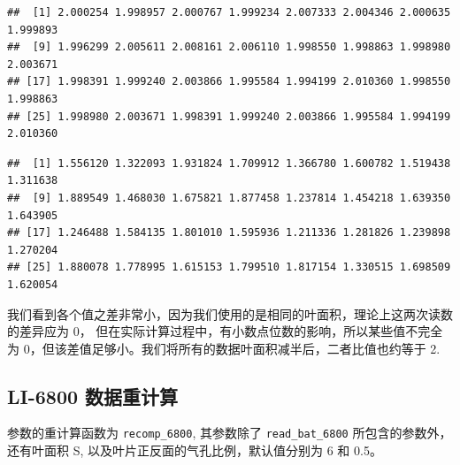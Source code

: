 \documentclass[
]{krantz}
\makeatletter
\newenvironment{Shaded}{\begin{snugshade}}{\end{snugshade}}
\newcommand{\CommentTok}[1]{\textcolor[rgb]{0.56,0.35,0.01}{\textit{#1}}}
\newcommand{\DataTypeTok}[1]{\textcolor[rgb]{0.13,0.29,0.53}{#1}}
\newcommand{\DecValTok}[1]{\textcolor[rgb]{0.00,0.00,0.81}{#1}}
\newcommand{\FloatTok}[1]{\textcolor[rgb]{0.00,0.00,0.81}{#1}}
\newcommand{\KeywordTok}[1]{\textcolor[rgb]{0.13,0.29,0.53}{\textbf{#1}}}
\newcommand{\NormalTok}[1]{#1}
\newcommand{\OperatorTok}[1]{\textcolor[rgb]{0.81,0.36,0.00}{\textbf{#1}}}
\newcommand{\StringTok}[1]{\textcolor[rgb]{0.31,0.60,0.02}{#1}}
\newenvironment{kframe}{%
\medskip{}
\setlength{\fboxsep}{.8em}
 \def\at@end@of@kframe{}%
 \ifinner\ifhmode%
  \def\at@end@of@kframe{\end{minipage}}%
  \begin{minipage}{\columnwidth}%
 \fi\fi%
 \def\FrameCommand##1{\hskip\@totalleftmargin \hskip-\fboxsep
 \colorbox{shadecolor}{##1}\hskip-\fboxsep
     \hskip-\linewidth \hskip-\@totalleftmargin \hskip\columnwidth}%
 \MakeFramed {\advance\hsize-\width
   \@totalleftmargin\z@ \linewidth\hsize
   \@setminipage}}%
 {\par\unskip\endMakeFramed%
 \at@end@of@kframe}
\renewenvironment{Shaded}{\begin{kframe}}{\end{kframe}}
\makeatother
\begin{document}
\begin{verbatim}
##  [1] 2.000254 1.998957 2.000767 1.999234 2.007333 2.004346 2.000635 1.999893
##  [9] 1.996299 2.005611 2.008161 2.006110 1.998550 1.998863 1.998980 2.003671
## [17] 1.998391 1.999240 2.003866 1.995584 1.994199 2.010360 1.998550 1.998863
## [25] 1.998980 2.003671 1.998391 1.999240 2.003866 1.995584 1.994199 2.010360
\end{verbatim}

\begin{Shaded}
\end{Shaded}

\begin{verbatim}
##  [1] 1.556120 1.322093 1.931824 1.709912 1.366780 1.600782 1.519438 1.311638
##  [9] 1.889549 1.468030 1.675821 1.877458 1.237814 1.454218 1.639350 1.643905
## [17] 1.246488 1.584135 1.801010 1.595936 1.211336 1.281826 1.239898 1.270204
## [25] 1.880078 1.778995 1.615153 1.799510 1.817154 1.330515 1.698509 1.620054
\end{verbatim}

我们看到各个值之差非常小，因为我们使用的是相同的叶面积，理论上这两次读数的差异应为 0， 但在实际计算过程中，有小数点位数的影响，所以某些值不完全为 0，但该差值足够小。我们将所有的数据叶面积减半后，二者比值也约等于 2.

\hypertarget{recompute6800}{%
\subsection{LI-6800 数据重计算}\label{recompute6800}}

参数的重计算函数为 \texttt{recomp\_6800}, 其参数除了 \texttt{read\_bat\_6800} 所包含的参数外，还有叶面积 S, 以及叶片正反面的气孔比例，默认值分别为 6 和 0.5。
\end{document}

